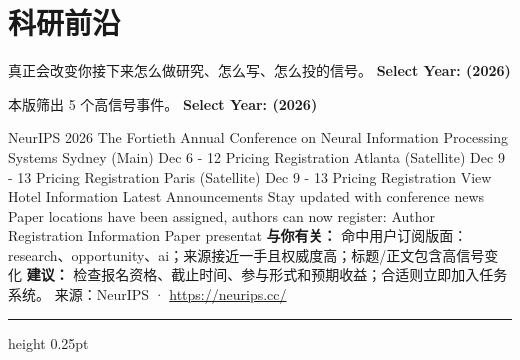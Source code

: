 \documentclass[10.5pt]{ctexart}
\begin{document}
\section*{科研前沿}
{\color{ormuted} 真正会改变你接下来怎么做研究、怎么写、怎么投的信号。}
\vspace{2mm}
{\LARGE\bfseries Select Year: (2026)}\par
\vspace{1mm}
{\color{ormuted} 本版筛出 5 个高信号事件。}
\vspace{3mm}
{\Large\bfseries Select Year: (2026)}\par
NeurIPS 2026 The Fortieth Annual Conference on Neural Information Processing Systems Sydney (Main) Dec 6 - 12 Pricing Registration Atlanta (Satellite) Dec 9 - 13 Pricing Registration Paris (Satellite) Dec 9 - 13 Pricing Registration View Hotel Information Latest Announcements Stay updated with conference news Paper locations have been assigned, authors can now register: Author Registration Information Paper presentat
\textbf{与你有关：} 命中用户订阅版面：research、opportunity、ai；来源接近一手且权威度高；标题/正文包含高信号变化
\textbf{建议：} 检查报名资格、截止时间、参与形式和预期收益；合适则立即加入任务系统。
{\footnotesize\color{ormuted} 来源：NeurIPS · \url{https://neurips.cc/}}
\vspace{4mm}
\hrule height 0.25pt
\vspace{3mm}
\end{document}
